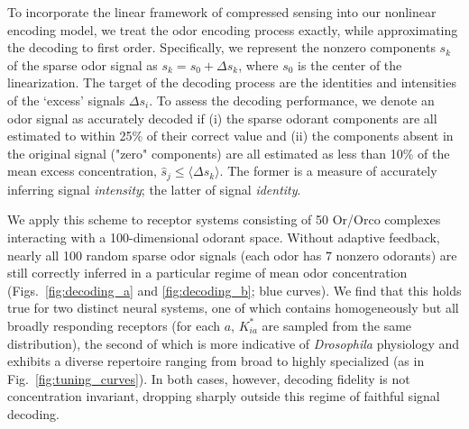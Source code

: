 To incorporate the linear framework of compressed sensing into our nonlinear encoding model, we treat the odor encoding process exactly, while approximating the decoding to first order. %
Specifically, we represent the nonzero components $s_k$ of the sparse odor signal as $s_k = s_0 + \Delta s_k$, where $s_0$ is the center of the linearization. The target of the decoding process are the identities and intensities of the `excess' signals $\Delta s_i$. 
To assess the decoding performance, we denote an odor signal as accurately decoded if (i) the sparse odorant components are all estimated to within 25\% of their correct value and (ii) the components absent in the original signal ("zero" components) are all estimated as less than 10\% of the mean excess concentration, $\hat s_j \le \langle \Delta s_k \rangle$. The former is a measure of accurately inferring signal \textit{intensity}; the latter of signal \textit{identity}. 

We apply this scheme to receptor systems consisting of 50 Or/Orco complexes interacting with a 100-dimensional odorant space. Without adaptive feedback, nearly all 100 random sparse odor signals (each odor has $7$ nonzero odorants) are still correctly inferred in a particular regime of mean odor concentration (Figs.~\ref{fig:decoding_a} and \ref{fig:decoding_b}; blue curves). We find that this holds true for two distinct neural systems, one of which contains homogeneously but all broadly responding receptors (for each $a$, $K^*_{ia}$ are sampled from the same distribution), the second of which is more indicative of \textit{Drosophila} physiology and exhibits a diverse repertoire ranging from broad to highly specialized (as in Fig.~\ref{fig:tuning_curves}). In both cases, however, decoding fidelity is not concentration invariant, dropping sharply outside this regime of faithful signal decoding.

